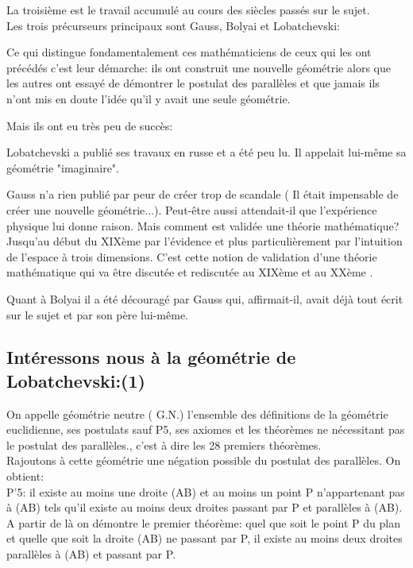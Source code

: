 \documentclass[a4paper, 12pt, twoside]{book}
\begin{document}
 La troisième est le travail accumulé au cours des siècles passés sur le sujet.\\
 
 

 Les trois précurseurs principaux sont Gauss, Bolyai et Lobatchevski:

  Ce qui distingue fondamentalement ces mathématiciens de ceux qui les ont précédés c’est leur démarche: ils ont construit une nouvelle géométrie alors que les autres ont essayé de démontrer le postulat des parallèles et que jamais ils n’ont mis en doute l’idée qu’il y avait une seule géométrie.
  
  Mais ils ont eu très peu de succès:
 
 Lobatchevski a publié ses travaux en russe et a été peu lu. Il appelait lui-même sa géométrie "imaginaire".
 
  Gauss n’a rien publié par peur de créer trop de scandale ( Il était impensable de créer une nouvelle géométrie...). Peut-être aussi attendait-il que l'expérience physique lui donne raison. Mais comment est validée une théorie mathématique? Jusqu’au début du XIXème par l’évidence et plus particulièrement par l’intuition de l’espace à trois dimensions. C’est cette notion de validation d’une théorie mathématique qui va être discutée et rediscutée au XIXème et au XXème .

  Quant à Bolyai il a été découragé par Gauss qui, affirmait-il, avait déjà tout écrit sur le sujet et par son père lui-même.
\subsection{Intéressons nous à la géométrie de Lobatchevski:(1)}
  


 On appelle géométrie neutre ( G.N.) l’ensemble des définitions de la géométrie euclidienne, ses  postulats sauf P5, ses axiomes et les théorèmes ne nécessitant pas le postulat des parallèles., c'est à dire les 28 premiers théorèmes.\\
 
 
  Rajoutons à cette géométrie une négation possible du postulat des parallèles. On obtient:\\
  
  P'5: il existe au moins une droite (AB) et au moins un point P n’appartenant pas à (AB) tels qu’il existe au moins deux droites  passant par P et parallèles à (AB).\\
  
 A partir de là on démontre le premier théorème: quel que soit le point P du plan et quelle que soit la droite (AB) ne passant par P, il existe au moins deux droites parallèles à (AB) et passant par P. \\
 
\end{document}
